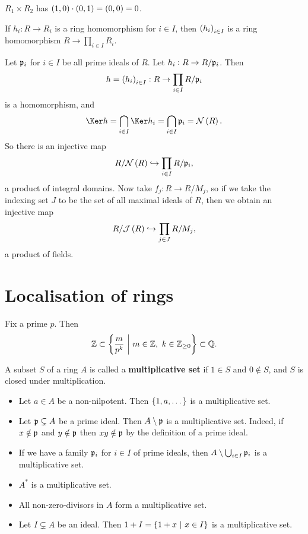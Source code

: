 \begin{example*}
$ R_1 \times R_2 $ has $ \br{1, 0} \cdot \br{0, 1} = \br{0, 0} = 0 $.
\end{example*}

If $ h_i : R \to R_i $ is a ring homomorphism for $ i \in I $, then $ \br{h_i}_{i \in I} $ is a ring homomorphism $ R \to \prod_{i \in I} R_i $.

\begin{remark}
Let $ \mathfrak{p}_i $ for $ i \in I $ be all prime ideals of $ R $. Let $ h_i : R \to R / \mathfrak{p}_i $. Then
$$ h = \br{h_i}_{i \in I} : R \to \prod_{i \in I} R / \ppp_i $$
is a homomorphism, and
$$ \Ker h = \bigcap_{i \in I} \Ker h_i = \bigcap_{i \in I} \ppp_i = \NNN\br{R}. $$
So there is an injective map
$$ R / \NNN\br{R} \hookrightarrow \prod_{i \in I} R / \ppp_i, $$
a product of integral domains. Now take $ f_j : R \to R / M_j $, so if we take the indexing set $ J $ to be the set of all maximal ideals of $ R $, then we obtain an injective map
$$ R / \JJJ\br{R} \hookrightarrow \prod_{j \in J} R / M_j, $$
a product of fields.
\end{remark}

\pagebreak

\section{Localisation of rings}

\begin{example*}
Fix a prime $ p $. Then
$$ \ZZ \subset \cbr{\dfrac{m}{p^k} \st m \in \ZZ, \ k \in \ZZ_{\ge 0}} \subset \QQ. $$
\end{example*}

\begin{definition}
A subset $ S $ of a ring $ A $ is called a \textbf{multiplicative set} if $ 1 \in S $ and $ 0 \notin S $, and $ S $ is closed under multiplication.
\end{definition}

\begin{example}
\hfill
\begin{itemize}
\item Let $ a \in A $ be a non-nilpotent. Then $ \cbr{1, a, \dots} $ is a multiplicative set.
\item Let $ \mathfrak{p} \subsetneq A $ be a prime ideal. Then $ A \setminus \mathfrak{p} $ is a multiplicative set. Indeed, if $ x \notin \mathfrak{p} $ and $ y \notin \mathfrak{p} $ then $ xy \notin \mathfrak{p} $ by the definition of a prime ideal.
\item If we have a family $ \mathfrak{p}_i $ for $ i \in I $ of prime ideals, then $ A \setminus \bigcup_{i \in I} \mathfrak{p}_i $ is a multiplicative set.
\item $ A^* $ is a multiplicative set.
\item All non-zero-divisors in $ A $ form a multiplicative set.
\item Let $ I \subsetneq A $ be an ideal. Then $ 1 + I = \cbr{1 + x \st x \in I} $ is a multiplicative set.
\end{itemize}
\end{example}

